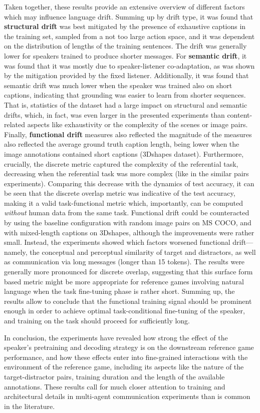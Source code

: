 Taken together, these results provide an extensive overview of different factors which may influence language drift. Summing up by drift type, it was found that \textbf{structural drift} was best mitigated by the presence of exhaustive captions in the training set, sampled from a not too large action space, and it was dependent on the distribution of lengths of the training sentences. The drift was generally lower for speakers trained to produce shorter messages. For \textbf{semantic drift}, it was found that it was mostly due to speaker-listener co-adaptation, as was shown by the mitigation provided by the fixed listener. Additionally, it was found that semantic drift was much lower when the speaker was trained also on short captions, indicating that grounding was easier to learn from shorter sequences. That is, statistics of the dataset had a large impact on structural and semantic drifts, which, in fact, was even larger in the presented experiments than content-related aspects like exhaustivity or the complexity of the scenes or image pairs. Finally, \textbf{functional drift} measures also reflected the magnitude of the measures also reflected the average ground truth caption length, being lower when the image annotations contained short captions (3Dshapes dataset). Furthermore, crucially, the discrete metric captured the complexity of the referential task, decreasing when the referential task was more complex (like in the similar pairs experiments).
Comparing this decrease with the dynamics of test accuracy, it can be seen that the discrete overlap metric was indicative of the test accuracy, making it a valid task-functional metric which, importantly, can be computed \emph{without} human data from the same task. Functional drift could be counteracted by using the baseline configuration with random image pairs on MS COCO, and with mixed-length captions on 3Dshapes, although the improvements were rather small. Instead, the experiments showed which factors worsened functional drift---namely, the conceptual and perceptual similarity of target and distractors, as well as communication via long messages (longer than 15 tokens). The results were generally more pronounced for discrete overlap, suggesting that this surface form based metric might be more appropriate for reference games involving natural language when the task fine-tuning phase is rather short. 
Summing up, the results allow to conclude that the functional training signal should be prominent enough in order to achieve optimal task-conditional fine-tuning of the speaker, and training on the task should proceed for sufficiently long.

In conclusion, the experiments have revealed how strong the effect of the speaker's pretraining and decoding strategy is on the downstream reference game performance, and how these effects enter into fine-grained interactions with the environment of the reference game, including its aspects like the nature of the target-distractor pairs, training duration and the length of the available annotations. These results call for much closer attention to training and architectural details in multi-agent communication experiments than is common in the literature.
